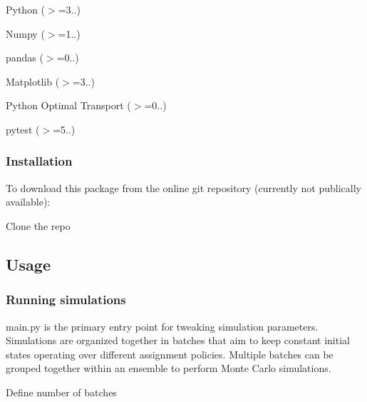 \begin{DoxyItemize}
\item Python ($>$=3..)
\item Numpy ($>$=1..)
\item pandas ($>$=0..)
\item Matplotlib ($>$=3..)
\item Python Optimal Transport ($>$=0..) 
\begin{DoxyCode}{0}
\end{DoxyCode}

\item pytest ($>$=5..) 
\begin{DoxyCode}{0}
\end{DoxyCode}

\end{DoxyItemize}

\subsubsection*{Installation}

To download this package from the online git repository (currently not publically available)\+:


\begin{DoxyEnumerate}
\item Clone the repo 
\begin{DoxyCode}{0}
\end{DoxyCode}

\end{DoxyEnumerate}

\subsection*{Usage}

\subsubsection*{Running simulations}

main.\+py is the primary entry point for tweaking simulation parameters. Simulations are organized together in batches that aim to keep constant initial states operating over different assignment policies. Multiple batches can be grouped together within an ensemble to perform Monte Carlo simulations.

Define number of batches 
\begin{DoxyCode}{0}
\end{DoxyCode}


